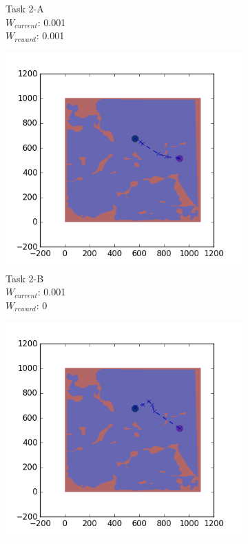 \documentclass{tamuccthesis}
\begin{document}
\begin{figure}
\begin{subfigure}[b]{0.24\textwidth}
        \caption{{\small Task 2-A \\ $W_{current}$: 0.001 \\ $W_{reward}$: 0.001}}   
        \label{fig:Path_2-A_upCurrent_Reward}
    \end{subfigure}
  \begin{subfigure}[b]{0.24\textwidth}
        \centering
        \includegraphics[width=\textwidth,trim={4cm 3cm 2cm 3cm},clip]{EXP3RG_PathBb_-1_-1_0d001_0.png}
        \caption{{\small Task 2-B \\ $W_{current}$: 0.001 \\ $W_{reward}$: 0}}    
        \label{fig:Path_2-B_upCurrent_noReward}
    \end{subfigure}
    \begin{subfigure}[b]{0.24\textwidth}  
        \centering 
        \includegraphics[width=\textwidth,trim={4cm 3cm 2cm 3cm},clip]{EXP3RG_PathBb_-1_-1_0d001_-1.png}

\end{subfigure}
\end{figure}
\end{document}

